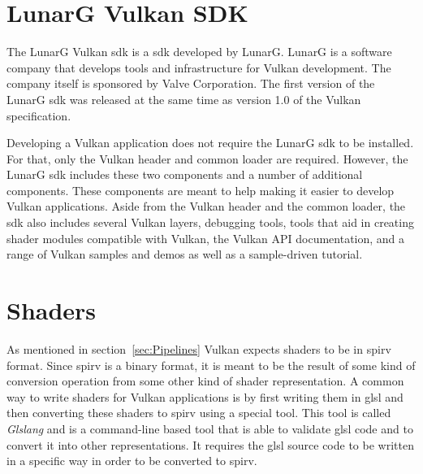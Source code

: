 




  \section{LunarG Vulkan SDK}
  \label{sec:LunarGSDK}
    The LunarG Vulkan \acrshort{sdk}\cite{lunargvulkansdk} is a \acrfull{sdk} developed by LunarG. LunarG is a software company that develops tools and infrastructure for Vulkan development. The company itself is sponsored by Valve Corporation. The first version of the LunarG \gls{sdk} was released at the same time as version 1.0 of the Vulkan specification.

    Developing a Vulkan application does not require the LunarG \gls{sdk} to be installed. For that, only the Vulkan header and common loader are required. However, the LunarG \gls{sdk} includes these two components and a number of additional components. These components are meant to help making it easier to develop Vulkan applications. Aside from the Vulkan header and the common loader, the \gls{sdk} also includes several Vulkan layers, debugging tools, tools that aid in creating shader modules compatible with Vulkan, the Vulkan API documentation, and a range of Vulkan samples and demos as well as a sample-driven tutorial.


  \section{Shaders}
  \label{sec:EnvShaders}
    As mentioned in section~\ref{sec:Pipelines} Vulkan expects shaders to be in \gls{spirv} format. Since \gls{spirv} is a binary format, it is meant to be the result of some kind of conversion operation from some other kind of shader representation. A common way to write shaders for Vulkan applications is by first writing them in \gls{glsl} and then converting these shaders to \gls{spirv} using a special tool. This tool is called \textit{Glslang}\cite{glslangrepo} and is a command-line based tool that is able to validate \gls{glsl} code and to convert it into other representations. It requires the \gls{glsl} source code to be written in a specific way in order to be converted to \gls{spirv}.

